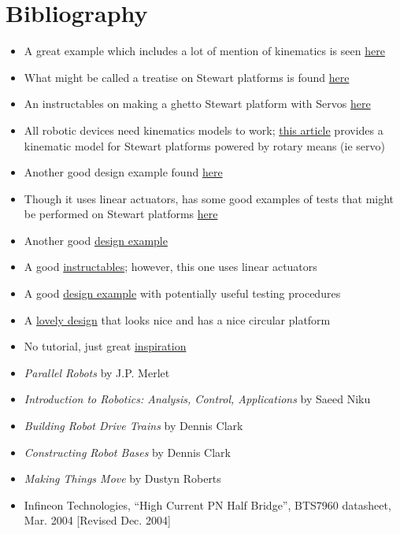 \documentclass[a4paper, 10pt]{article}
\begin{document}
\section{Bibliography}
	\begin{itemize}
		\item A great example which includes a lot of mention of kinematics is seen \href{https://ntrs.nasa.gov/api/citations/19910007810/downloads/19910007810.pdf}{here}
		\item What might be called a treatise on Stewart platforms is found \href{https://www.ri.cmu.edu/pub_files/pub4/fong_terrence_w_1990_1/fong_terrence_w_1990_1.pdf}{here}
		\item An instructables on making a ghetto Stewart platform with Servos \href{https://www.instructables.com/Stewart-Platform/}{here}
		\item All robotic devices need kinematics models to work; \href{https://www.xarg.org/paper/inverse-kinematics-of-a-stewart-platform/}{this article} provides a kinematic model for Stewart platforms powered by rotary means (ie servo)
		\item Another good design example found \href{https://iopscience.iop.org/article/10.1088/1757-899X/563/5/052059/pdf}{here}
		\item Though it uses linear actuators, has some good examples of tests that might be performed on Stewart platforms \href{https://www.ncbi.nlm.nih.gov/pmc/articles/PMC6513003/}{here}
		\item Another good \href{https://core.ac.uk/download/pdf/322824733.pdf}{design example}
		\item A good \href{https://www.instructables.com/Six-Axis-Platform-Using-Linear-Actuators-Stewart-P/}{instructables}; however, this one uses linear actuators
		\item A good \href{https://www.ohio.edu/mechanical-faculty/williams/html/PDF/IndRob02.pdf}{design example} with potentially useful testing procedures
		\item A \href{https://www.mdpi.com/2218-6581/7/2/30}{lovely design} that looks nice and has a nice circular platform
		\item No tutorial, just great \href{https://www.youtube.com/watch?v=kscvCQTtVvw&t=0s}{inspiration}
		\item \textit{Parallel Robots} by J.P. Merlet
		\item \textit{Introduction to Robotics: Analysis, Control, Applications} by Saeed Niku
		\item \textit{Building Robot Drive Trains} by Dennis Clark
		\item \textit{Constructing Robot Bases} by Dennis Clark
		\item \textit{Making Things Move} by Dustyn Roberts		
		\item Infineon Technologies, ``High Current PN Half Bridge'', BTS7960 datasheet, Mar. 2004 [Revised Dec. 2004]
	\end{itemize}	
\end{document}
